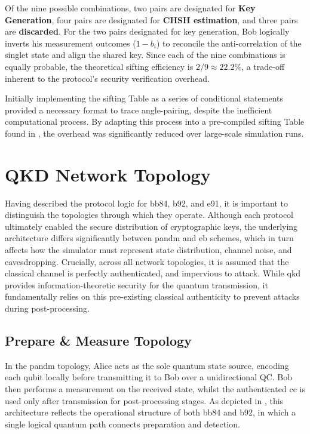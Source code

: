 Of the nine possible combinations, two pairs are designated for \textbf{Key Generation}, four pairs are designated for \textbf{CHSH estimation}, and three pairs are \textbf{discarded}. For the two pairs designated for key generation, Bob logically inverts his measurement outcomes ($1 - b_i$) to reconcile the anti-correlation of the singlet state and align the shared key. Since each of the nine combinations is equally probable, the theoretical \gls{sifting} efficiency is $2/9 \approx 22.2\%$, a trade-off inherent to the protocol's security verification overhead.

Initially implementing the \gls{sifting} Table as a series of conditional statements provided a necessary format to trace angle-pairing, despite the inefficient computational process. By adapting this process into a pre-compiled \gls{sifting} Table found in , the overhead was significantly reduced over large-scale simulation runs. 


\newpage
\section{QKD Network Topology}
\label{sec:networktopology}

Having described the protocol logic for \gls{bb84}, \gls{b92}, and \gls{e91}, it is important to distinguish the topologies through which they operate. Although each protocol ultimately enabled the secure distribution of cryptographic keys, the underlying architecture differs significantly between \gls{pandm} and \gls{eb} schemes, which in turn affects how the simulator must represent state distribution, channel noise, and eavesdropping. Crucially, across all network topologies, it is assumed that the classical channel is perfectly authenticated, and impervious to attack. While \gls{qkd} provides information-theoretic security for the quantum transmission, it fundamentally relies on this pre-existing classical authenticity to prevent attacks during post-processing.

\subsection{Prepare \& Measure Topology}
\label{subsec:pmtopology}
In the \gls{pandm} topology, Alice acts as the sole quantum state source, encoding each \gls{qubit} locally before transmitting it to Bob over a unidirectional QC. Bob then performs a measurement on the received state, whilst the authenticated \gls{cc} is used only after transmission for post-processing stages. As depicted in , this architecture reflects the operational structure of both \gls{bb84} and \gls{b92}, in which a single logical quantum path connects preparation and detection.

